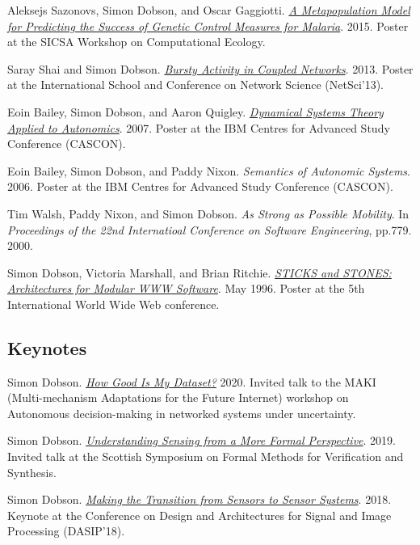 \documentclass[11pt]{article}
\begin{document}
\label{orge6b0de8}Aleksejs Sazonovs, Simon Dobson, and Oscar Gaggiotti.  \emph{\href{https://simondobson.org/softcopy/sazonovs-poster-15.pdf}{A Metapopulation Model for Predicting the Success of Genetic Control Measures for Malaria}}. 2015. Poster at the SICSA Workshop on Computational Ecology.

\label{org06ee859}Saray Shai and Simon Dobson.  \emph{\href{https://simondobson.org/softcopy/burst-netsci13.pdf}{Bursty Activity in Coupled Networks}}. 2013. Poster at the International School and Conference on Network Science (NetSci’13).

\label{org84e97be}Eoin Bailey, Simon Dobson, and Aaron Quigley.  \emph{\href{https://simondobson.org/softcopy/LERO-CASCON07.pdf}{Dynamical Systems Theory Applied to Autonomics}}. 2007. Poster at the IBM Centres for Advanced Study Conference (CASCON).

\label{org3d49ef8}Eoin Bailey, Simon Dobson, and Paddy Nixon.  \emph{Semantics of Autonomic Systems}. 2006. Poster at the IBM Centres for Advanced Study Conference (CASCON).

\label{org2b5f5fe}Tim Walsh, Paddy Nixon, and Simon Dobson.  \emph{As Strong as Possible Mobility}. In \emph{Proceedings of the 22nd Internatioal Conference on Software Engineering}, pp.779. 2000.

\label{orgd4d1121}Simon Dobson, Victoria Marshall, and Brian Ritchie.  \emph{\href{https://simondobson.org/softcopy/threads-www-94.pdf}{STICKS and STONES: Architectures for Modular WWW Software}}. May 1996. Poster at the 5th International World Wide Web conference.

\subsection{Keynotes}
\label{sec:org246816b}

\label{org4030b6c}Simon Dobson.  \emph{\href{https://simondobson.org/softcopy/how-good-is-my-dataset.pdf}{How Good Is My Dataset?}} 2020. Invited talk to the MAKI (Multi-mechanism Adaptations for the Future Internet) workshop on Autonomous decision-making in networked systems under uncertainty.

\label{orgac64352}Simon Dobson.  \emph{\href{https://simondobson.org/softcopy/formal-perspective.pdf}{Understanding Sensing from a More Formal Perspective}}. 2019. Invited talk at the Scottish Symposium on Formal Methods for Verification and Synthesis.

\label{org22d1b1e}Simon Dobson.  \emph{\href{https://simondobson.org/softcopy/dasip-keynote.pdf}{Making the Transition from Sensors to Sensor Systems}}. 2018. Keynote at the Conference on Design and Architectures for Signal and Image Processing (DASIP’18).
\end{document}

